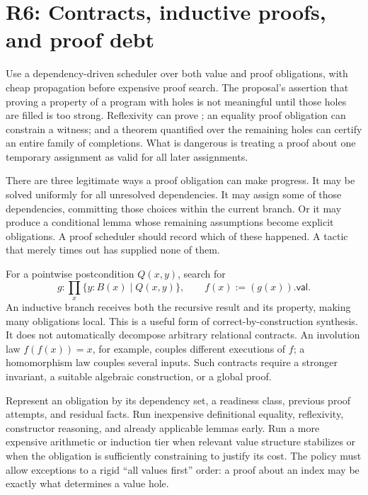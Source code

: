 \section{R6: Contracts, inductive proofs, and proof debt}\label{sec:contracts}


\answer Use a dependency-driven scheduler over both value and proof obligations, with cheap propagation before expensive proof search. The proposal's assertion that proving a property of a program with holes is not meaningful until those holes are filled is too strong. Reflexivity can prove ; an equality proof obligation can constrain a witness; and a theorem quantified over the remaining holes can certify an entire family of completions. What is dangerous is treating a proof about one temporary assignment as valid for all later assignments.

There are three legitimate ways a proof obligation can make progress. It may be solved uniformly for all unresolved dependencies. It may assign some of those dependencies, committing those choices within the current branch. Or it may produce a conditional lemma whose remaining assumptions become explicit obligations. A proof scheduler should record which of these happened. A tactic that merely times out has supplied none of them.

For a pointwise postcondition $Q(x,y)$, search for
\[
 g : \prod_x \{y:B(x)\mid Q(x,y)\},
 \qquad f(x):=(g(x)).\mathsf{val}.
\]
An inductive branch receives both the recursive result and its property, making many obligations local. This is a useful form of correct-by-construction synthesis. It does not automatically decompose arbitrary relational contracts. An involution law $f(f(x))=x$, for example, couples different executions of $f$; a homomorphism law couples several inputs. Such contracts require a stronger invariant, a suitable algebraic construction, or a global proof.

Represent an obligation by its dependency set, a readiness class, previous proof attempts, and residual facts. Run inexpensive definitional equality, reflexivity, constructor reasoning, and already applicable lemmas early. Run a more expensive arithmetic or induction tier when relevant value structure stabilizes or when the obligation is sufficiently constraining to justify its cost. The policy must allow exceptions to a rigid ``all values first'' order: a proof about an index may be exactly what determines a value hole.

